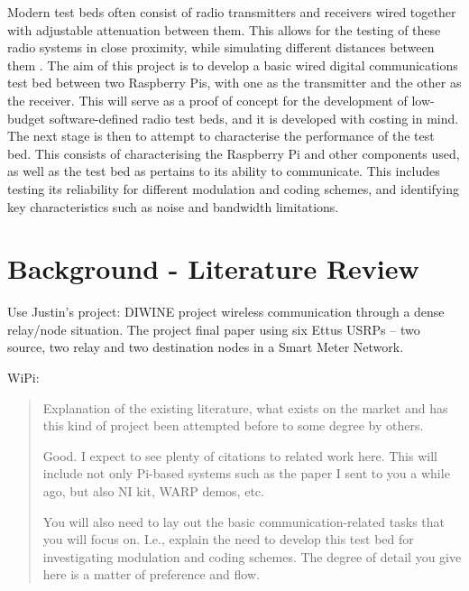 \documentclass[../main.tex]{subfiles}
\begin{document}
Modern test beds often consist of radio transmitters and receivers wired together with adjustable attenuation between them.
This allows for the testing of these radio systems in close proximity, while simulating different distances between them \cite{pap_MilitaryRadioTB}.
The aim of this project is to develop a basic wired digital communications test bed between two Raspberry Pis, with one as the transmitter and the other as the receiver.
This will serve as a proof of concept for the development of low-budget software-defined radio test beds, and it is developed with costing in mind.
The next stage is then to attempt to characterise the performance of the test bed.
This consists of characterising the Raspberry Pi and other components used, as well as the test bed as pertains to its ability to communicate.
This includes testing its reliability for different modulation and coding schemes, and identifying key characteristics such as noise and bandwidth limitations.\\


\section{Background - Literature Review} \label{sec_Lit Review}

Use Justin's project:
DIWINE project \cite{pap_DIWINEpaper4} wireless communication through a dense relay/node situation.
The project final paper using six Ettus USRPs -- two source, two relay and two destination nodes in a Smart Meter Network.

WiPi:



\begin{quotation}
	Explanation of the existing literature, what exists on the market and has this kind of project been attempted before to some degree by others.
	
	Good.  I expect to see plenty of citations to related work here.  This will include not only Pi-based systems such as the paper I sent to you a while ago, but also NI kit, WARP demos, etc.
	
	You will also need to lay out the basic communication-related tasks that you will focus on.  I.e., explain the need to develop this test bed for investigating modulation and coding schemes.  The degree of detail you give here is a matter of preference and flow.
\end{quotation}
\end{document}
